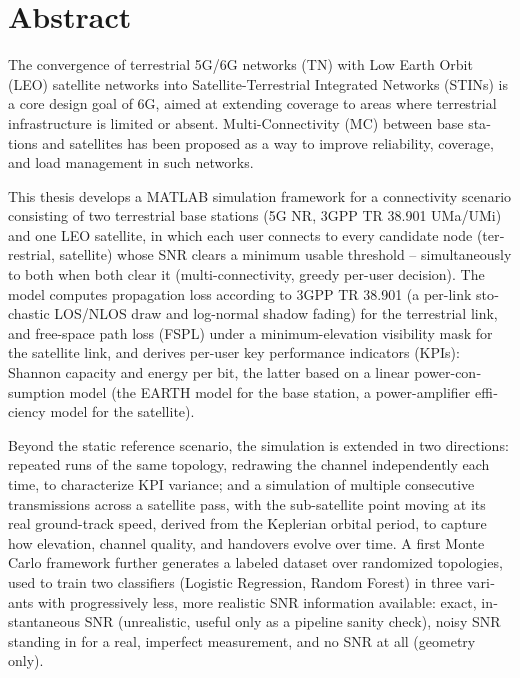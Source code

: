\chapter*{Abstract}
\begin{english}

The convergence of terrestrial 5G/6G networks (TN) with Low Earth Orbit
(LEO) satellite networks into Satellite-Terrestrial Integrated Networks
(STINs) is a core design goal of 6G, aimed at extending coverage to areas
where terrestrial infrastructure is limited or absent. Multi-Connectivity
(MC) between base stations and satellites has been proposed as a way to
improve reliability, coverage, and load management in such networks.

This thesis develops a MATLAB simulation framework for a connectivity
scenario consisting of two terrestrial base stations (5G NR, 3GPP TR
38.901 UMa/UMi) and one LEO satellite, in which each user connects to
every candidate node (terrestrial, satellite) whose SNR clears a minimum
usable threshold -- simultaneously to both when both clear it
(multi-connectivity, greedy per-user decision). The model computes
propagation loss according to
3GPP TR 38.901 (a per-link stochastic LOS/NLOS draw and log-normal shadow
fading) for the terrestrial link, and free-space path loss (FSPL) under a
minimum-elevation visibility mask for the satellite link, and derives
per-user key performance indicators (KPIs): Shannon capacity and energy
per bit, the latter based on a linear power-consumption model (the EARTH
model for the base station, a power-amplifier efficiency model for the
satellite).

Beyond the static reference scenario, the simulation is extended in two
directions: repeated runs of the same topology, redrawing the channel
independently each time, to characterize KPI variance; and a simulation
of multiple consecutive transmissions across a satellite pass, with the
sub-satellite point moving at its real ground-track speed, derived from
the Keplerian orbital period, to capture how elevation, channel quality,
and handovers evolve over time. A first Monte Carlo framework further
generates a labeled dataset over randomized topologies, used to train two
classifiers (Logistic Regression, Random Forest) in three variants with
progressively less, more realistic SNR information available: exact,
instantaneous SNR (unrealistic, useful only as a pipeline sanity check),
noisy SNR standing in for a real, imperfect measurement, and no SNR at
all (geometry only).


\end{english}
